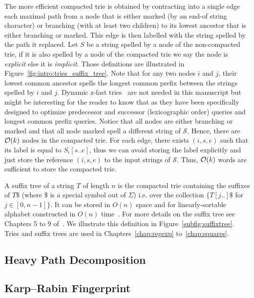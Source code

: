 The more efficient compacted trie is obtained by contracting  into a single edge each maximal path from a node that is either marked (by an end-of string character) or branching (with at least two children) to its lowest ancestor that is either branching or marked.
This edge is then labelled with the string spelled by the path it replaced.
Let $S$ be a string spelled by a node of the non-compacted trie, if it is also spelled by a node of the compacted trie we say the node is \emph{explicit} else it is \emph{implicit}. Those definitions are illustrated in Figure~\ref{fig:intro:tries_suffix_tree}. Note that for any two nodes $i$ and $j$, their lowest common ancestor spells the longest common prefix between the strings spelled by $i$ and $j$.
Dynamic z-fast tries~\cite{belazzougui2010dynamic} are not needed in this manuscript but might be interesting for the reader to know that as they have been specifically designed to optimize predecessor and successor (lexicographic order) queries and longest common prefix queries.
%
Notice that all nodes are either branching or marked and that all node marked spell a different string of $\mathcal{S}$. 
Hence, there are $\mathcal{O}(k)$ nodes in the compacted trie.
For each edge, there exists $(i,s,e)$ such that its label is equal to $S_i[s .. e]$, thus we can avoid storing the label explicitly and just store the reference $(i,s,e)$ to the input strings of $\mathcal{S}$.
Thus, $\mathcal{O}(k)$ words are sufficient to store the compacted trie.

A suffix tree of a string $T$ of length $n$ is the compacted trie containing the suffixes of $T\$$ (where \$ is a special symbol out of $\Sigma$) i.e. over the collection $\{T[j..]\$$ for $ j \in [0,n-1] \}$. It can be stored in $O(n)$ space and for linearly-sortable alphabet constructed in $O(n)$ time~\cite{Farach1997}. For more details on the suffix tree see Chapters 5 to 9 of~\cite{Gusfield1997}. We illustrate this definition in Figure~\ref{subfig:suffixtree}. Tries and suffix trees are used in Chapters~\ref{chap:regexp} to~\ref{chap:squares}.



\subsection{Heavy Path Decomposition}\label{sec:prelim:HP}

\subsection{Karp--Rabin Fingerprint}\label{sec:prelim:KR}

